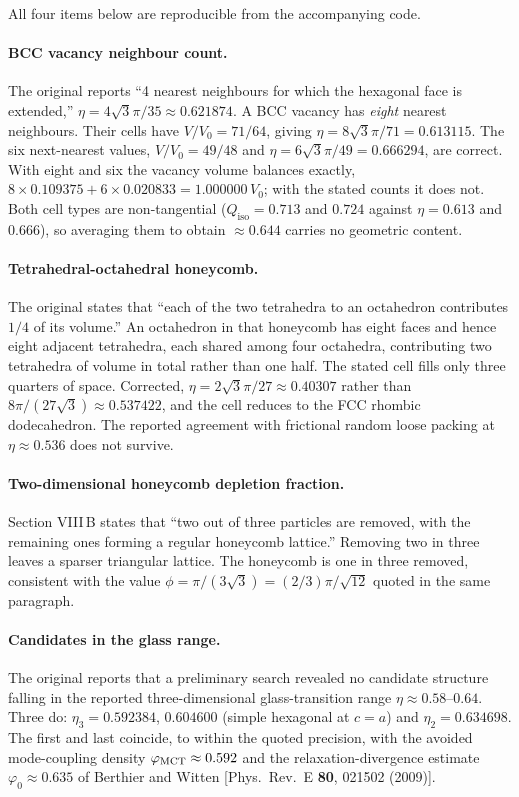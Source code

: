 \documentclass[aps,prl,twocolumn,superscriptaddress,floatfix]{revtex4-2}
\begin{document}
All four items below are reproducible from the accompanying code.

\paragraph{BCC vacancy neighbour count.} The original reports ``4 nearest
neighbours for which the hexagonal face is extended,''
$\eta=4\sqrt3\pi/35\approx0.621874$. A BCC vacancy has \emph{eight} nearest
neighbours. Their cells have $V/V_0=71/64$, giving
$\eta = 8\sqrt3\pi/71 = 0.613115$. The six next-nearest values,
$V/V_0=49/48$ and $\eta=6\sqrt3\pi/49=0.666294$, are correct. With eight and six
the vacancy volume balances exactly,
$8\times0.109375 + 6\times0.020833 = 1.000000\,V_0$; with the stated counts it
does not. Both cell types are non-tangential ($Q_{\mathrm{iso}}=0.713$ and
$0.724$ against $\eta=0.613$ and $0.666$), so averaging them to obtain
$\approx0.644$ carries no geometric content.

\paragraph{Tetrahedral-octahedral honeycomb.} The original states that ``each of
the two tetrahedra to an octahedron contributes $1/4$ of its volume.'' An
octahedron in that honeycomb has eight faces and hence eight adjacent tetrahedra,
each shared among four octahedra, contributing two tetrahedra of volume in total
rather than one half. The stated cell fills only three quarters of space.
Corrected, $\eta = 2\sqrt3\pi/27 \approx 0.40307$ rather than
$8\pi/(27\sqrt3)\approx0.537422$, and the cell reduces to the FCC rhombic
dodecahedron. The reported agreement with frictional random loose packing at
$\eta\approx0.536$ does not survive.

\paragraph{Two-dimensional honeycomb depletion fraction.} Section VIII\,B states
that ``two out of three particles are removed, with the remaining ones forming a
regular honeycomb lattice.'' Removing two in three leaves a sparser triangular
lattice. The honeycomb is one in three removed, consistent with the value
$\phi=\pi/(3\sqrt3)=(2/3)\pi/\sqrt{12}$ quoted in the same paragraph.

\paragraph{Candidates in the glass range.} The original reports that a
preliminary search revealed no candidate structure falling in the reported
three-dimensional glass-transition range $\eta\approx0.58$--$0.64$. Three do: $\eta_3=0.592384$, $0.604600$ (simple hexagonal at $c=a$) and
$\eta_2=0.634698$. The first and last coincide, to within the quoted precision,
with the avoided mode-coupling density $\varphi_{\rm MCT}\approx0.592$ and the
relaxation-divergence estimate $\varphi_0\approx0.635$ of Berthier and Witten
[Phys.\ Rev.\ E \textbf{80}, 021502 (2009)].
\end{document}
